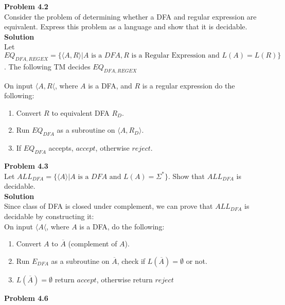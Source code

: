 \documentclass{article}
\newcommand\curl[1]{\{#1\}}
\newcommand{\problem}[1]{\large{\textbf{Problem #1}}\\}
\begin{document}
\problem{4.2}

    Consider the problem of determining whether a DFA and regular expression are equivalent. Express this problem as a language and show that it is decidable. \\

\textbf{Solution}\\
    
    Let $EQ_{DFA,REGEX} = \curl{\langle A, R \rangle | A \text{ is a } DFA, R \text{ is a Regular Expression and } L(A) = L(R)} $. The following TM 
    decides $EQ_{DFA,REGEX}$
    
    On input $ \langle A,R \langle $, where $A$ is a DFA, and $R$ is a regular expression do the following:
    \begin{enumerate}[1., leftmargin = 1.5cm]
    \itemsep0em
    \item Convert $R$ to equivalent DFA $R_{D}$.
    \item Run $EQ_{DFA}$ as a subroutine on $\langle A, R_{D} \rangle$.
    \item If $EQ_{DFA}$ accepts, $accept$, otherwise $reject$.
    \end{enumerate}

\pagebreak

\problem{4.3}

    Let $ALL_{DFA} = \curl{\langle A \rangle | A \text{ is a } DFA \text{ and } L(A) = \Sigma^*} $. Show that $ALL_{DFA}$ is decidable.\\
    
    \textbf{Solution}\\

    Since class of DFA is closed under complement, we can prove that $ALL_{DFA}$ is decidable by constructing it:\\

    On input $ \langle A \langle $, where $A$ is a DFA, do the following:
    \begin{enumerate}[1., leftmargin = 1.5cm]
    \itemsep0em
    \item Convert $A$ to $\overline{A}$ (complement of $A$).
    \item Run $E_{DFA}$ as a subroutine on $\overline{A}$, check if $L(\overline{A}) = \emptyset $ or not.
    \item $L(\overline{A}) = \emptyset $ return $accept$, otherwise return $reject$\\
    \end{enumerate}

\problem{4.6}
\end{document}
